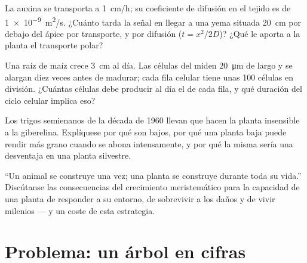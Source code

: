 \begin{exercise}[$\star\star$]\label{exo:b2:plant-meristems:9}
La auxina se transporta a \qty{1}{cm/h}; su coeficiente de difusión en el
tejido es de \qty{1e-9}{m^2/s}. ¿Cuánto tarda la señal en llegar a una yema
situada \qty{20}{cm} por debajo del ápice por transporte, y por difusión
($t = x^2/2D$)? ¿Qué le aporta a la planta el transporte polar?
\end{exercise}

\begin{exercise}[$\star\star\star$]\label{exo:b2:plant-meristems:10}
Una raíz de maíz crece \qty{3}{cm} al día. Las células del  miden
\qty{20}{\micro m} de largo y se alargan diez veces antes de madurar; cada
fila celular tiene unas \num{100} células en división. ¿Cuántas células
debe producir al día el  de cada fila, y qué duración del ciclo
celular implica eso?
\end{exercise}

\begin{exercise}[$\star\star\star$]\label{exo:b2:plant-meristems:11}
Los trigos semienanos de la década de 1960 llevan  que hacen la
planta insensible a la giberelina. Explíquese por qué son bajos, por qué
una planta baja puede rendir más grano cuando se abona intensamente, y por
qué la misma  sería una desventaja en una planta silvestre.
\end{exercise}

\begin{exercise}[$\star\star\star$]\label{exo:b2:plant-meristems:12}
``Un animal se construye una vez; una planta se construye durante toda su
vida.'' Discútanse las consecuencias del crecimiento meristemático para la
capacidad de una planta de responder a su entorno, de sobrevivir a los
daños y de vivir milenios --- y un coste de esta estrategia.
\end{exercise}

\section{Problema: un árbol en cifras}


